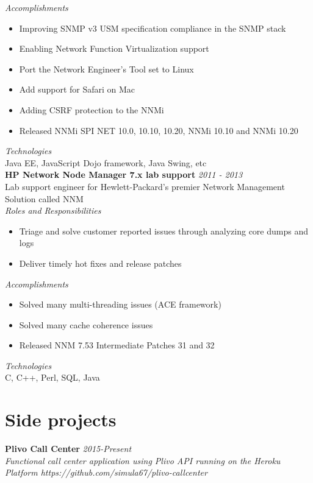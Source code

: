 \documentclass[line,margin]{res}
\begin{document}
\begin{resume}
{\it{Accomplishments}}\\
\begin{itemize}
\item Improving SNMP v3 USM specification compliance in the SNMP stack
\item Enabling Network Function Virtualization support
\item Port the Network Engineer's Tool set to Linux
\item Add support for Safari on Mac
\item Adding CSRF protection to the NNMi
\item Released NNMi SPI NET 10.0, 10.10, 10.20, NNMi 10.10 and NNMi 10.20
\end{itemize}

{\it{Technologies}}\\
Java EE, JavaScript Dojo framework, Java Swing, etc\\

{\bf HP Network Node Manager 7.x lab support} \hfill {\it{2011 - 2013}}\\
Lab support engineer for Hewlett-Packard's premier Network Management Solution called NNM\\

{\it{Roles and Responsibilities}}\\
\begin{itemize}
\item Triage and solve customer reported issues through analyzing core dumps and logs
\item Deliver timely hot fixes and release patches
\end{itemize}

{\it{Accomplishments}}\\
\begin{itemize}
\item Solved many multi-threading issues (ACE framework)
\item Solved many cache coherence issues
\item Released NNM 7.53 Intermediate Patches 31 and 32
\end{itemize}


{\it{Technologies}}\\
C, C++, Perl, SQL, Java

\section{Side projects}
{\bf Plivo Call Center} \hfill \it{2015-Present}\\
Functional call center application using Plivo API running on the Heroku Platform
https://github.com/simula67/plivo-callcenter\\



\end{resume}
\end{document}
